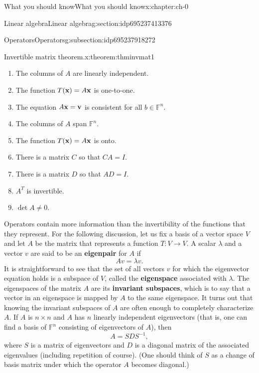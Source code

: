 \documentclass[oneside,10pt,]{book}
\newcommand{\terminology}[1]{\textbf{#1}}
\numberwithin{equation}{section}
\newcommand{\F}{\mathbb{F}}
\newcommand{\inv}{^{-1}}
\newcommand\la{\lambda}
\numberwithin{equation}{section}
\newcommand{\vec}[1]{{\bf #1}}
\begin{document}
\begin{chapterptx}{What you should know}{}{What you should know}{}{}{x:chapter:ch-0}
\begin{sectionptx}{Linear algebra}{}{Linear algebra}{}{}{g:section:idp695237413376}
\begin{subsectionptx}{Operators}{}{Operators}{}{}{g:subsection:idp695237918272}
\begin{theorem}{Invertible matrix theorem.}{}{x:theorem:thminvmat1}
\begin{enumerate}
\item{}The columns of \(A\) are linearly independent.%
\item{}The function \(T(\vec x) = A \vec x\) is one-to-one.%
\item{}The equation \(A \vec x = \vec v\) is consistent for all \(b \in \F^n\).%
\item{}The columns of \(A\) span \(\F^n\).%
\item{}The function \(T(\vec x) = A \vec x\) is onto.%
\item{}There is a matrix \(C\) so that \(C A = I\).%
\item{}There is a matrix \(D\) so that \(A D = I\).%
\item{}\(A^T\) is invertible.%
\item{}\(\displaystyle \det A \neq 0.\)%
\end{enumerate}
%
\end{theorem}
Operators contain more information than the invertibility of the functions that they represent. For the following discussion, let us fix a basis of a vector space \(V\) and let \(A\) be the matrix that represents a function \(T: V \to V\). A scalar \(\la\) and a vector \(v\) are said to be an \terminology{eigenpair} for \(A\) if%
\begin{equation*}
A v = \la v.
\end{equation*}
It is straightforward to see that the set of all vectors \(v\) for which the eigenvector equation holds is a subspace of \(V\), called the \terminology{eigenspace} associated with \(\la\). The eigenspaces of the matrix \(A\) are its \terminology{invariant subspaces}, which is to say that a vector in an eigenspace is mapped by \(A\) to the same eigenspace. It turns out that knowing the invariant subspaces of \(A\) are often enough to completely characterize \(A\). If \(A\) is \(n\times n\) and \(A\) has \(n\) linearly independent eigenvectors (that is, one can find a basis of \(\F^n\) consisting of eigenvectors of \(A\)), then%
\begin{equation*}
A = S D S\inv,
\end{equation*}
where \(S\) is a matrix of eigenvectors and \(D\) is a diagonal matrix of the associated eigenvalues (including repetition of course). (One should think of \(S\) as a change of basis matrix under which the operator \(A\) becomes diagonal.)%
\par

\end{subsectionptx}
\end{sectionptx}
\end{chapterptx}
\end{document}
